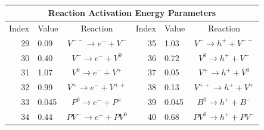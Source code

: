 \documentclass[pdf,ps2pdf,11pt]{SANDreport}
\begin{document}
{\begin{table}
\begin{center}
\begin{tabular}{|r|l|c|r|l|c|}
\hline
\end{tabular} \\[3ex]
\begin{tabular}{|r|l|c|r|l|c|}
\hline 
\multicolumn{6}{|c|}{Reaction Activation Energy Parameters} \\
\hline
\multicolumn{1}{|c|}{Index} & 
\multicolumn{1}{c|}{Value} & 
\multicolumn{1}{c|}{Reaction} & 
\multicolumn{1}{c|}{Index} & 
\multicolumn{1}{c|}{Value} & 
\multicolumn{1}{c|}{Reaction} \\ 
\hline\hline
29 & 0.09 & $V^{--} \rightarrow e^- + V^-$ & 35 & 1.03 & $V^- \rightarrow h^+ + V^{--}$ \\
30 & 0.40 & $V^- \rightarrow e^- + V^0$    & 36 & 0.72 & $V^0 \rightarrow h^+ + V^-$    \\
31 & 1.07 & $V^0 \rightarrow e^- + V^+$    & 37 & 0.05 & $V^+ \rightarrow h^+ + V^0$    \\
32 & 0.99 & $V^+ \rightarrow e^- + V^{++}$ & 38 & 0.13 & $V^{++} \rightarrow h^+ + V^+$ \\ 
33 & 0.045 & $P^0 \rightarrow e^- + P^+$    & 39 & 0.045 & $B^0 \rightarrow h^+ + B^-$    \\
34 & 0.44 & $PV^- \rightarrow e^- + PV^0$  & 40 & 0.68 & $PV^0 \rightarrow h^+ + PV^-$  \\
\hline
\end{tabular}
\end{center}
\end{table}
\esinglespace}
\end{document}
